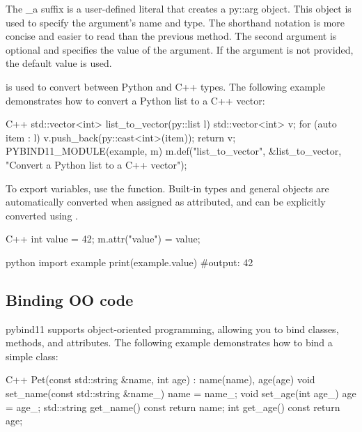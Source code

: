 The \_a suffix is a user-defined literal that creates a py::arg object. This object is used to specify the argument's name and type. The shorthand notation is more concise and easier to read than the previous method.
The second argument is optional and specifies the  value of the argument. If the argument is not provided, the default value is used.

 is used to convert between Python and C++ types. The following example demonstrates how to convert a Python list to a C++ vector:

\begin{neonlisting}[language=C++]{C++}
    std::vector<int> list_to_vector(py::list l) {
        std::vector<int> v;
        for (auto item : l) {
            v.push_back(py::cast<int>(item));
        }
        return v;
    }
    PYBIND11_MODULE(example, m) {
        m.def("list_to_vector", &list_to_vector, "Convert a Python list to a C++ vector");
    }
\end{neonlisting}

To export variables, use the  function. Built-in types and general objects are automatically converted when assigned as attributed, 
and can be explicitly converted using .

\begin{neonlisting}[language=C++]{C++}
    int value = 42;
    m.attr("value") = value;
\end{neonlisting}

\begin{neonlisting}{python}
    import example
    print(example.value) #output: 42
\end{neonlisting}

\subsection{Binding OO code}

pybind11 supports object-oriented programming, allowing you to bind classes, methods, and attributes. The following example demonstrates how to bind a simple class:

\begin{neonlisting}[language=C++]{C++}
    Pet(const std::string &name, int age) : name(name), age(age) {}
    void set_name(const std::string &name_) { name = name_; }
    void set_age(int age_) { age = age_; }
    std::string get_name() const { return name; }
    int get_age() const { return age; }
\end{neonlisting}

